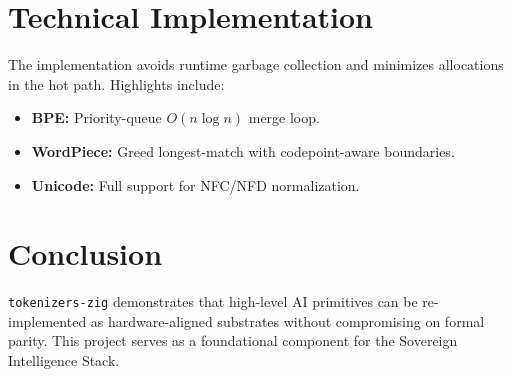 \documentclass[10pt]{article}
\begin{document}
\section{Technical Implementation}
The implementation avoids runtime garbage collection and minimizes allocations in the hot path. Highlights include:
\begin{itemize}
    \item \textbf{BPE:} Priority-queue $O(n \log n)$ merge loop.
    \item \textbf{WordPiece:} Greed longest-match with codepoint-aware boundaries.
    \item \textbf{Unicode:} Full support for NFC/NFD normalization.
\end{itemize}

\section{Conclusion}
\texttt{tokenizers-zig} demonstrates that high-level AI primitives can be re-implemented as hardware-aligned substrates without compromising on formal parity. This project serves as a foundational component for the Sovereign Intelligence Stack.
\end{document}
